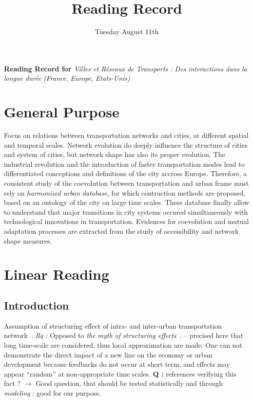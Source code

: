 


\title{Reading Record\bigskip\\
\textit{\cite{bretagnolle:tel-00459720}}
}
\author{}
\date{Tuesday August 11th}


\maketitle

\justify


\textbf{Reading Record for \cite{bretagnolle:tel-00459720}} \textit{Villes et R{\'e}seaux de Transports : Des interactions dans la longue dur{\'e}e (France, Europe, Etats-Unis)}


\section*{General Purpose}

Focus on relations between transportation networks and cities, at different spatial and temporal scales. Network evolution do deeply influence the structure of cities and system of cities, but network shape has also its proper evolution. The industrial revolution and the introduction of faster transportation modes lead to differentiated conceptions and definitions of the city accross Europe. Therefore, a consistent study of the coevolution between transportation and urban frame must rely on \emph{harmonized urban database}, for which contruction methods are proposed, based on an ontology of the city on large time scales. These database finally allow to understand that major transitions in city systems occured simultaneously with technological innovations in transportation. Evidences for coevolution and mutual adaptation processes are extracted from the study of accessibility and network shape measures.




\section{Linear Reading}



\subsection*{Introduction}


Assumption of structuring effect of intra- and inter-urban transportation network~\cite{bavoux2005geographie}. \textit{Rq :} Opposed to \emph{the myth of structuring effects}~\cite{offner1993effets}. -- precised here that long time-scale are considered, thus local approximation are made. One can not demonstrate the direct impact of a new line on the economy or urban development because feedbacks do not occur at short term, and effects may appear ``random'' at non-appropriate time scales. \textbf{Q : } references verifying this fact ? $\rightarrow$ Good question, that should be tested statistically and through \emph{modeling} : good for our purpose.

